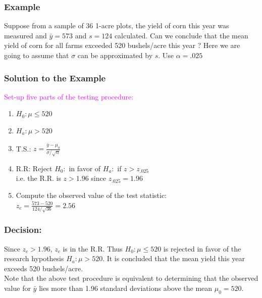 \documentclass[xcolor=dvipsnames,12pt]{beamer}
\begin{document}
\begin{frame}
\frametitle{Example }
Suppose from  a sample of 36 1-acre plots, the yield of corn this
year was measured and $\bar{y}=573$ and $s=124$ calculated.
Can we conclude that the mean yield of corn for all farms exceeded
520 bushels/acre this year ? Here we are going to assume that 
$\sigma$ can be approximated by $s$. Use $\alpha=.025$\\[.1in]
\end{frame}

 
 
\begin{frame}
\frametitle{Solution to the Example} 
\textcolor{magenta}{Set-up five parts of the testing procedure:}
\begin{enumerate}
\item $  H_0: \mu \leq 520$
\item $ H_a: \mu > 520 $
\item T.S.:  $z  =  \frac{\bar{y}-\mu_0}{\sigma/\sqrt{n}}$ 
\item R.R: Reject $H_0:$ in favor of $H_a:$ if $z > z_{.025}$ \\
 i.e. the R.R. is $z>1.96$ since $z_{.025}=1.96$
\item Compute the observed value of the test statistic:\\
 $z_c =\frac{573-520}{124/{\sqrt{36}}}= 2.56$
\end{enumerate}
\end{frame}




\begin{frame}
\frametitle{Decision:}
Since  $z_c> 1.96$,  $z_c$ is in the R.R. Thus $H_0:\mu \leq 520$ is rejected in favor of the
research hypothesis $ H_a: \mu > 520 $. It is  concluded that the 
mean yield this year exceeds 520 bushels/acre.\\[.1in]
Note that the above test procedure is equivalent to determining that
the  observed value for $\bar{y}$ lies more than 1.96 standard
deviations above the mean $\mu_0=520$.
\end{frame}
\end{document}

